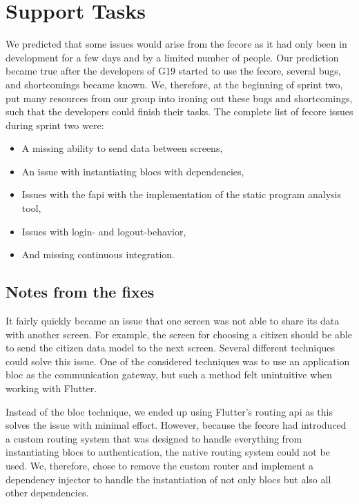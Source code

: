 \section{Support Tasks}

We predicted that some issues would arise from the \gls{fecore} as it had only been in development for a few days and by a limited number of people. Our prediction became true after the developers of \gls{G19} started to use the \gls{fecore}, several bugs, and shortcomings became known. We, therefore, at the beginning of sprint two, put many resources from our group into ironing out these bugs and shortcomings, such that the developers could finish their tasks. The complete list of \gls{fecore} issues during sprint two were:

\begin{itemize}
  \item A missing ability to send data between screens,
  \item An issue with instantiating \glspl{bloc} with dependencies,
  \item Issues with the \gls{fapi} with the implementation of the static program analysis tool,
  \item Issues with login- and logout-behavior,
  \item And missing continuous integration.
\end{itemize}

\subsection{Notes from the fixes}

It fairly quickly became an issue that one screen was not able to share its data with another screen. For example, the screen for choosing a citizen should be able to send the citizen data model to the next screen. Several different techniques could solve this issue. One of the considered techniques was to use an application \gls{bloc} as the communication gateway, but such a method felt unintuitive when working with Flutter.

Instead of the \gls{bloc} technique, we ended up using Flutter's routing \gls{api} as this solves the issue with minimal effort. However, because the \gls{fecore} had introduced a custom routing system that was designed to handle everything from instantiating \glspl{bloc} to authentication, the native routing system could not be used. We, therefore, chose to remove the custom router and implement a dependency injector to handle the instantiation of not only \glspl{bloc} but also all other dependencies.

